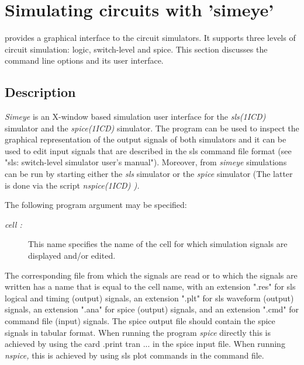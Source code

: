 
\chapter{Simulating circuits with 'simeye'}
\label{s-simeye}
 provides a graphical interface to the circuit simulators.
It supports three levels of circuit simulation: logic, switch-level and spice.
This section discusses the  command line options and its user
interface.
\section{Description}
{\it Simeye}
is an X-window based simulation user interface for the
{\it sls(1ICD)}
simulator and the
{\it spice(1ICD)}
simulator.
The program
can be used to inspect the graphical representation of the
output signals of both simulators and
it can be used to edit input signals that
are described in the sls command file format 
(see "sls: switch-level simulator user's manual").
Moreover, from 
{\it simeye}
simulations can be run
by starting either the
{\it sls} 
simulator or the 
{\it spice}
simulator
(The latter is done via the script %
\it nspice(1ICD)\rm%
).
\par
The following program argument may be specified:
\begin{description}
\item[{\it cell : }]
This name specifies the name of the cell for
which simulation signals are displayed and/or edited.
\end{description}
The corresponding file from which the signals are read or to which
the signals are written has a name
that is equal to the cell name, with an extension ".res"
for sls logical and timing (output) signals,
an extension ".plt"
for sls waveform (output) signals,
an extension ".ana"
for spice (output) signals,
and an extension ".cmd"
for command file (input) signals.
The spice output file should contain the spice signals
in tabular format.
When running the program 
{\it spice}
directly this is achieved by
using the card .print tran ... in the spice input file.
When running 
{\it nspice,}
this is achieved by using
sls plot commands in the command file.
